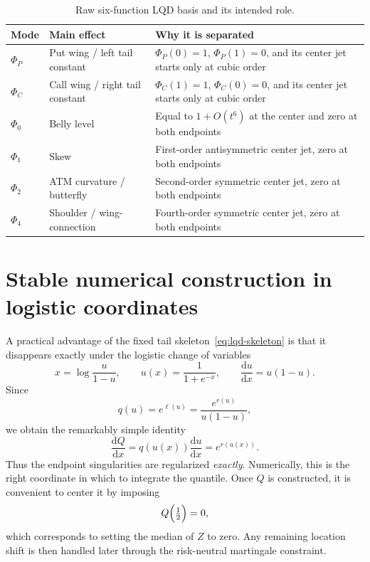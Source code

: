 \documentclass[11pt]{article}
\newcommand{\dd}{\mathrm{d}}
\begin{document}
\begin{table}[h]
\centering
\caption{Raw six-function LQD basis and its intended role.}
\label{tab:raw-basis-summary}
\begin{tabularx}{\textwidth}{>{\raggedright\arraybackslash}p{2.1cm} >{\raggedright\arraybackslash}p{4.6cm} X}
\toprule
Mode & Main effect & Why it is separated \\
\midrule
$\Phi_P$ & Put wing / left tail constant & $\Phi_P(0)=1$, $\Phi_P(1)=0$, and its center jet starts only at cubic order \\
$\Phi_C$ & Call wing / right tail constant & $\Phi_C(1)=1$, $\Phi_C(0)=0$, and its center jet starts only at cubic order \\
$\Phi_0$ & Belly level & Equal to $1+O(t^6)$ at the center and zero at both endpoints \\
$\Phi_1$ & Skew & First-order antisymmetric center jet, zero at both endpoints \\
$\Phi_2$ & ATM curvature / butterfly & Second-order symmetric center jet, zero at both endpoints \\
$\Phi_4$ & Shoulder / wing-connection & Fourth-order symmetric center jet, zero at both endpoints \\
\bottomrule
\end{tabularx}
\end{table}

\section{Stable numerical construction in logistic coordinates}
A practical advantage of the fixed tail skeleton~\eqref{eq:lqd-skeleton} is that it disappears exactly under the logistic change of variables
\[
x = \log\frac{u}{1-u},
\qquad
u(x) = \frac{1}{1+e^{-x}},
\qquad
\frac{\dd u}{\dd x} = u(1-u).
\]
Since
\[
q(u) = e^{\ell(u)} = \frac{e^{r(u)}}{u(1-u)},
\]
we obtain the remarkably simple identity
\begin{equation}
\frac{\dd Q}{\dd x}
= q(u(x))\frac{\dd u}{\dd x}
= e^{r(u(x))}.
\label{eq:dQdx}
\end{equation}
Thus the endpoint singularities are regularized \emph{exactly}. Numerically, this is the right coordinate in which to integrate the quantile. Once $Q$ is constructed, it is convenient to center it by imposing
\[
Q\Bigl(\tfrac12\Bigr)=0,
\]
which corresponds to setting the median of $Z$ to zero. Any remaining location shift is then handled later through the risk-neutral martingale constraint.
\end{document}
